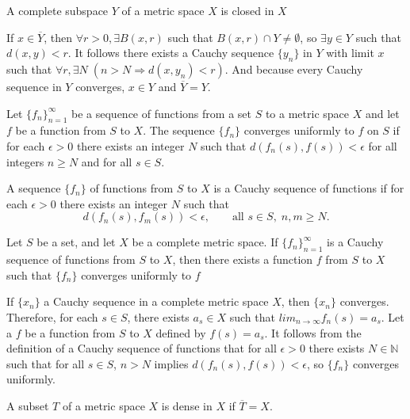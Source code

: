 \documentclass[nobib,notoc]{tufte-handout}
\begin{document}
\begin{thm}
	A complete subspace \(Y\) of a metric space \(X\) is closed in \(X\)
	\begin{IEEEproof}
		If \(x\in\overline{Y}\), then \(\forall r>0,\exists B(x,r)\) such that \(B(x,r)\cap Y\neq\emptyset\), so \(\exists y\in Y\) such that \(d(x,y)<r\). It follows there exists a Cauchy sequence \(\{y_n\}\) in \(Y\) with limit \(x\) such that \(\forall r,\exists N\;(n>N\Rightarrow d(x,y_n)<r)\). And because every Cauchy sequence in \(Y\) converges, \(x\in Y\) and \(\overline{Y}=Y\).
	\end{IEEEproof}
\end{thm}
\begin{defi}
	Let \(\{f_n\}_{n=1}^{\infty}\) be a sequence of functions from a set \(S\) to a metric space \(X\) and let \(f\) be a function from \(S\) to \(X\). The sequence \(\{f_n\}\) converges uniformly to \(f\) on \(S\) if for each \(\epsilon>0\) there exists an integer \(N\) such that \(d(f_n(s),f(s))<\epsilon\) for all integers \(n\geq N\) and for all \(s\in S\).
\end{defi}
\begin{defi}
	A sequence \(\{f_n\}\) of functions from \(S\) to \(X\) is a Cauchy sequence of functions if for each \(\epsilon>0\) there exists an integer \(N\) such that
	\begin{equation*}
		d(f_n(s),f_m(s))<\epsilon,\qquad\text{all }s\in S,\; n,m\geq N.
	\end{equation*}
\end{defi}
\begin{thm}
	Let \(S\) be a set, and let \(X\) be a complete metric space. If \(\{f_n\}_{n=1}^{\infty}\) is a Cauchy sequence of functions from \(S\) to \(X\), then there exists a function \(f\) from \(S\) to \(X\) such that \(\{f_n\}\) converges uniformly to \(f\)
	\begin{IEEEproof}
		If \(\{x_n\}\) a Cauchy sequence in a complete metric space \(X\), then \(\{x_n\}\) converges. Therefore, for each \(s\in S\), there exists \(a_s\in X\) such that \(lim_{n\rightarrow\infty}f_n(s)=a_s\). Let a \(f\) be a function from \(S\) to \(X\) defined by \(f(s)=a_s\). It follows from the definition of a Cauchy sequence of functions that for all \(\epsilon>0\) there exists \(N\in \mathbb{N}\) such that for all \(s\in S\), \(n>N\) implies \(d(f_n(s),f(s))<\epsilon\), so \(\{f_n\}\) converges uniformly.
	\end{IEEEproof}
\end{thm}
\begin{defi}
	A subset \(T\) of a metric space \(X\) is dense in \(X\) if \(\overline{T}=X\).
\end{defi}
\end{document}
